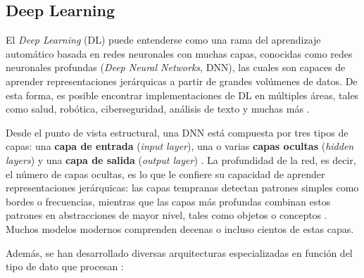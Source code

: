 \subsection{Deep Learning}

El \textit{Deep Learning} (DL) puede entenderse como una rama del aprendizaje automático basada en redes neuronales con muchas capas,
conocidas como redes neuronales profundas (\textit{Deep Neural Networks}, DNN), las cuales son capaces de aprender representaciones jerárquicas 
a partir de grandes volúmenes de datos. De esta forma, es posible encontrar implementaciones de DL en múltiples áreas, 
tales como salud, robótica, ciberseguridad, análisis de texto y muchas más \textcite{sarker2021deep}. 


Desde el punto de vista estructural, una DNN está compuesta por 
tres tipos de capas: una \textbf{capa de entrada} 
(\textit{input layer}), una o varias \textbf{capas ocultas} 
(\textit{hidden layers}) y una \textbf{capa de salida} 
(\textit{output layer}) \textcite{mclanddl}. La profundidad 
de la red, es decir, el número de capas ocultas, es lo que le 
confiere su capacidad de aprender representaciones jerárquicas: 
las capas tempranas detectan patrones simples como bordes o 
frecuencias, mientras que las capas más profundas combinan estos 
patrones en abstracciones de mayor nivel, tales como objetos 
o conceptos \textcite{lecun2015deep}. Muchos modelos modernos 
comprenden decenas o incluso cientos de estas capas.

Además, se han desarrollado diversas arquitecturas 
especializadas en función del tipo de dato que procesan 
\textcite{shiri2023comprehensive}:

